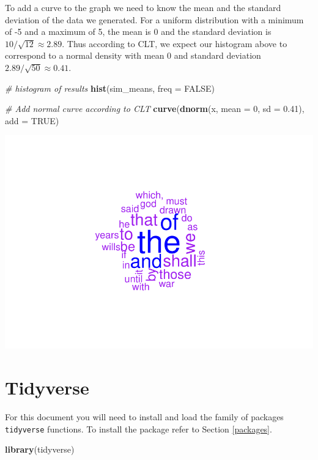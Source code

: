\documentclass[
]{book}
\newenvironment{Shaded}{\begin{snugshade}}{\end{snugshade}}
\newcommand{\CommentTok}[1]{\textcolor[rgb]{0.56,0.35,0.01}{\textit{#1}}}
\newcommand{\DataTypeTok}[1]{\textcolor[rgb]{0.13,0.29,0.53}{#1}}
\newcommand{\DecValTok}[1]{\textcolor[rgb]{0.00,0.00,0.81}{#1}}
\newcommand{\FloatTok}[1]{\textcolor[rgb]{0.00,0.00,0.81}{#1}}
\newcommand{\KeywordTok}[1]{\textcolor[rgb]{0.13,0.29,0.53}{\textbf{#1}}}
\newcommand{\NormalTok}[1]{#1}
\newcommand{\OtherTok}[1]{\textcolor[rgb]{0.56,0.35,0.01}{#1}}
\begin{document}
To add a curve to the graph we need to know the mean and the standard deviation of the data we generated. For a uniform distribution with a minimum of -5 and a maximum of 5, the mean is 0 and the standard deviation is \(10/\sqrt{12} \approx 2.89\). Thus according to CLT, we expect our histogram above to correspond to a normal density with mean 0 and standard deviation \(2.89/\sqrt{50} \approx 0.41\).

\begin{Shaded}
\begin{Highlighting}[]
\CommentTok{# histogram of results}
\KeywordTok{hist}\NormalTok{(sim_means, }\DataTypeTok{freq =} \OtherTok{FALSE}\NormalTok{)}

\CommentTok{# Add normal curve according to CLT}
\KeywordTok{curve}\NormalTok{(}\KeywordTok{dnorm}\NormalTok{(x, }\DataTypeTok{mean =} \DecValTok{0}\NormalTok{, }\DataTypeTok{sd =} \FloatTok{0.41}\NormalTok{), }\DataTypeTok{add =} \OtherTok{TRUE}\NormalTok{)}
\end{Highlighting}
\end{Shaded}

\includegraphics{_main_files/figure-latex/unnamed-chunk-227-1.pdf}

\hypertarget{tidyverse}{%
\chapter{Tidyverse}\label{tidyverse}}

For this document you will need to install and load the family of packages \texttt{tidyverse} functions. To install the package refer to Section \ref{packages}.

\begin{Shaded}
\begin{Highlighting}[]
\KeywordTok{library}\NormalTok{(tidyverse)}
\end{Highlighting}
\end{Shaded}
\end{document}
